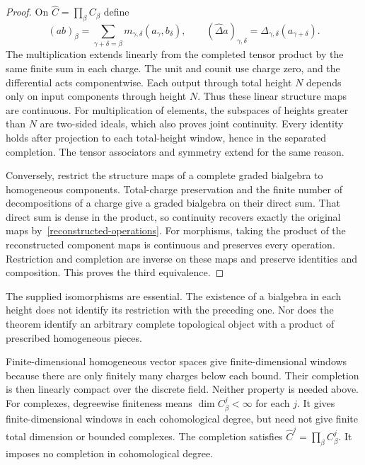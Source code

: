 \begin{proof}
On $\widehat C=\prod_\beta C_\beta$ define
\begin{equation}
 (ab)_\beta=\sum_{\gamma+\delta=\beta}
 m_{\gamma,\delta}(a_\gamma,b_\delta),\qquad
 (\widehat\Delta a)_{\gamma,\delta}
   =\Delta_{\gamma,\delta}(a_{\gamma+\delta}).
 \label{reconstructed-operations}
\end{equation}
The multiplication extends linearly from the completed tensor product
by the same finite sum in each charge.  The unit and counit use charge
zero, and the differential acts componentwise.
Each output through total height $N$ depends only on input components
through height $N$.  Thus these linear structure maps are continuous.
For multiplication of elements, the subspaces of heights greater than
$N$ are two-sided ideals, which also proves joint continuity.
Every identity holds after projection to each total-height window,
hence in the separated completion.  The tensor associators and symmetry
extend for the same reason.

Conversely, restrict the structure maps of a complete graded bialgebra
to homogeneous components.  Total-charge preservation and the finite
number of decompositions of a charge give a graded bialgebra on their
direct sum.  That direct sum is dense in the product, so continuity
recovers exactly the original maps by~\eqref{reconstructed-operations}.
For morphisms, taking the product of the reconstructed component maps
is continuous and preserves every operation.  Restriction and completion
are inverse on these maps and preserve identities and composition.
This proves the third equivalence.
\end{proof}

The supplied isomorphisms are essential.  The existence of a bialgebra
in each height does not identify its restriction with the preceding one.
Nor does the theorem identify an arbitrary complete topological object
with a product of prescribed homogeneous pieces.

Finite-dimensional homogeneous vector spaces give finite-dimensional
windows because there are only finitely many charges below each bound.
Their completion is then linearly compact over the discrete field.
Neither property is needed above.  For complexes, degreewise finiteness
means $\dim C_\beta^j<\infty$ for each $j$.
It gives finite-dimensional windows in each cohomological degree, but
need not give finite total dimension or bounded complexes.
The completion satisfies $\widehat C^j=\prod_\beta C_\beta^j$.
It imposes no completion in cohomological degree.

